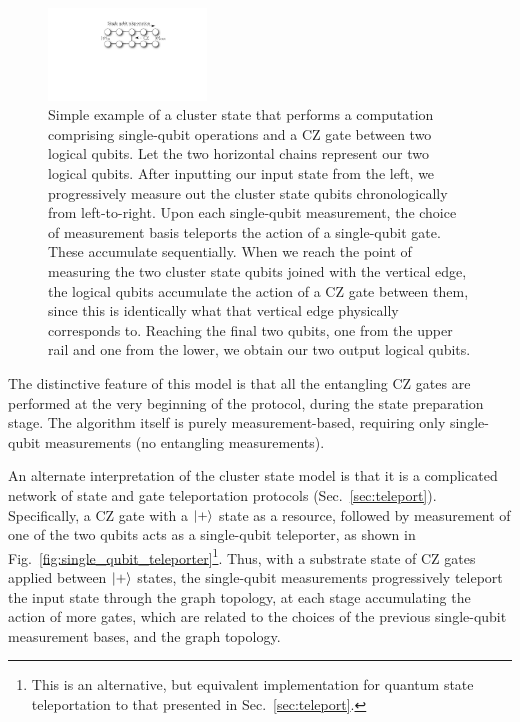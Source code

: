 \begin{figure}[!htbp]
	\includegraphics[clip=true, width=0.375\textwidth]{cluster_state_circuit}
	\captionspacefig \caption{Simple example of a cluster state that performs a computation comprising single-qubit operations and a CZ gate between two logical qubits. Let the two horizontal chains represent our two logical qubits. After inputting our input state from the left, we progressively measure out the cluster state qubits chronologically from left-to-right. Upon each single-qubit measurement, the choice of measurement basis teleports the action of a single-qubit gate. These accumulate sequentially. When we reach the point of measuring the two cluster state qubits joined with the vertical edge, the logical qubits accumulate the action of a CZ gate between them, since this is identically what that vertical edge physically corresponds to. Reaching the final two qubits, one from the upper rail and one from the lower, we obtain our two output logical qubits.} \label{fig:cluster_state_circuit}
\end{figure}

The distinctive feature of this model is that all the entangling CZ gates are performed at the very beginning of the protocol, during the state preparation stage. The algorithm itself is purely measurement-based, requiring only single-qubit measurements (no entangling measurements).

An alternate interpretation of the cluster state model is that it is a complicated network of state and gate teleportation protocols (Sec.~\ref{sec:teleport}). Specifically, a CZ gate with a $|+\rangle$ state as a resource, followed by measurement of one of the two qubits acts as a single-qubit teleporter, as shown in Fig.~\ref{fig:single_qubit_teleporter}\footnote{This is an alternative, but equivalent implementation for quantum state teleportation to that presented in Sec.~\ref{sec:teleport}.}. Thus, with a substrate state of CZ gates applied between $|+\rangle$ states, the single-qubit measurements progressively teleport the input state through the graph topology, at each stage accumulating the action of more gates, which are related to the choices of the previous single-qubit measurement bases, and the graph topology.

